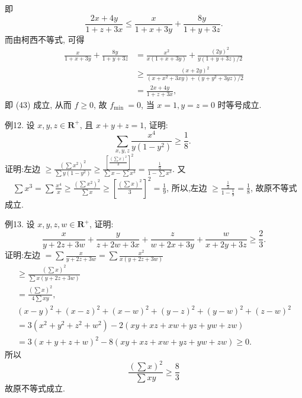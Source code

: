 即
$$
\frac{2 x+4 y}{1+z+3 x} \leqslant \frac{x}{1+x+3 y}+\frac{8 y}{1+y+3 z} . \label{(43)}
$$
而由柯西不等式, 可得
$$
\begin{aligned}
\frac{x}{1+x+3 y}+\frac{8 y}{1+y+3 z} & =\frac{x^2}{x(1+x+3 y)}+\frac{(2 y)^2}{y(1+y+3 z) / 2} \\
& \geqslant \frac{(x+2 y)^2}{\left(x+x^2+3 x y\right)+\left(y+y^2+3 y z\right) / 2} \\
& =\frac{2 x+4 y}{1+z+3 x},
\end{aligned}
$$
即 (43) 成立, 从而 $f \geqslant 0$, 故 $f_{\text {min }}=0$, 当 $x=1, y=z=0$ 时等号成立.



例12. 设 $x, y, z \in \mathbf{R}^{+}$, 且 $x+y+z=1$, 证明:
$$
\sum_{x, y, z} \frac{x^4}{y\left(1-y^2\right)} \geqslant \frac{1}{8} \text {. }
$$
证明:左边 $\geqslant \frac{\left(\sum x^2\right)^2}{\sum y\left(1-y^2\right)} \geqslant \frac{\left[\frac{\left(\sum x\right)^2}{3}\right]^2}{\sum x-\sum x^3}=\frac{\frac{1}{9}}{1-\sum x^3}$.
又 $\quad \sum x^3=\sum \frac{x^4}{x} \geqslant \frac{\left(\sum x^2\right)^2}{\sum x} \geqslant\left[\frac{\left(\sum x\right)^2}{3}\right]^2=\frac{1}{9}$,
所以,左边 $\geqslant \frac{\frac{1}{9}}{1-\frac{1}{9}}=\frac{1}{8}$, 故原不等式成立.



例13. 设 $x, y, z, w \in \mathbf{R}^{+}$, 证明:
$$
\frac{x}{y+2 z+3 w}+\frac{y}{z+2 w+3 x}+\frac{z}{w+2 x+3 y}+\frac{w}{x+2 y+3 z} \geqslant \frac{2}{3} .
$$
证明:左边 $=\sum \frac{x}{y+2 z+3 w}=\sum \frac{x^2}{x(y+2 z+3 w)}$
$$
\begin{gathered}
\geqslant \frac{\left(\sum x\right)^2}{\sum x(y+2 z+3 w)} \\
=\frac{\left(\sum x\right)^2}{4 \sum x y}, \\
(x-y)^2+(x-z)^2+(x-w)^2+(y-z)^2+(y-w)^2+(z-w)^2 \\
=3\left(x^2+y^2+z^2+w^2\right)-2(x y+x z+x w+y z+y w+z w) \\
=3(x+y+z+w)^2-8(x y+x z+x w+y z+y w+z w) \geqslant 0 .
\end{gathered}
$$
所以
$$
\frac{\left(\sum x\right)^2}{\sum x y} \geqslant \frac{8}{3}
$$
故原不等式成立.



